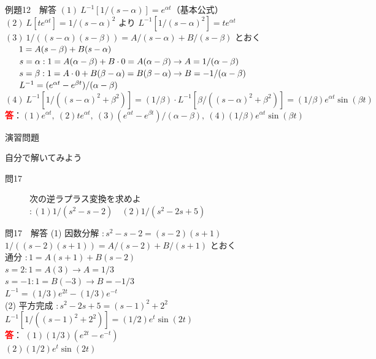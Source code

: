 \documentclass[professionalfonts]{beamer}
\begin{document}
\begin{frame}{例題12　解答}
  $(1)\ L^{-1}[1/(s-\alpha)] = e^{\alpha t}$（基本公式）\\[4pt]
  $(2)\ L[t e^{\alpha t}] = 1/(s-\alpha)^{2}$ より $L^{-1}[1/(s-\alpha)^{2}] = t e^{\alpha t}$\\[4pt]
  $(3)\ 1/((s-\alpha)(s-\beta)) = A/(s-\alpha) + B/(s-\beta)$ とおく\\[4pt]
  $\hphantom{(3)\ }1 = A(s-\beta) + B(s-\alpha)$\\[4pt]
  $\hphantom{(3)\ }s=\alpha: 1=A(\alpha-\beta)+B\cdot 0 = A(\alpha-\beta) \to A=1/(\alpha-\beta)$\\[4pt]
  $\hphantom{(3)\ }s=\beta: 1=A\cdot 0+B(\beta-\alpha) = B(\beta-\alpha) \to B=-1/(\alpha-\beta)$\\[4pt]
  $\hphantom{(3)\ }L^{-1} = (e^{\alpha t} - e^{\beta t})/(\alpha-\beta)$\\[4pt]
  $(4)\ L^{-1}[1/((s-\alpha)^{2}+\beta^{2})] = (1/\beta)\cdot L^{-1}[\beta/((s-\alpha)^{2}+\beta^{2})] = (1/\beta)e^{\alpha t}\sin(\beta t)$
  \\[8pt]\textcolor{red}{\textbf{答}}：$(1) e^{\alpha t},\ (2) t e^{\alpha t},\ (3) (e^{\alpha t}-e^{\beta t})/(\alpha-\beta),\ (4) (1/\beta)e^{\alpha t}\sin(\beta t)$
\end{frame}

\begin{frame}{演習問題}
  \begin{exampleblock}{自分で解いてみよう}
  \begin{description}
    \item[問17] 次の逆ラプラス変換を求めよ $: (1) 1/(s^{2}-s-2) \quad (2) 1/(s^{2}-2s+5)$
  \end{description}
  \end{exampleblock}
\end{frame}

\begin{frame}{問17　解答}
  (1) 因数分解 $: s^{2}-s-2 = (s-2)(s+1)$\\[4pt]
  $    1/((s-2)(s+1)) = A/(s-2) + B/(s+1)$ とおく\\[4pt]
  通分 $: 1 = A(s+1) + B(s-2)$\\[4pt]
  $    s=2: 1 = A(3) \to A=1/3$\\[4pt]
  $    s=-1: 1 = B(-3) \to B=-1/3$\\[4pt]
  $    L^{-1} = (1/3)e^{2t} - (1/3)e^{-t}$\\[4pt]
  (2) 平方完成 $: s^{2}-2s+5 = (s-1)^{2}+2^{2}$\\[4pt]
  $    L^{-1}[1/((s-1)^{2}+2^{2})] = (1/2)e^t \sin(2t)$
  \\[8pt]\textcolor{red}{\textbf{答}}：
  $(1) (1/3)(e^{2t} - e^{-t})$\\
  $(2) (1/2)e^t \sin(2t)$\\
\end{frame}
\end{document}
